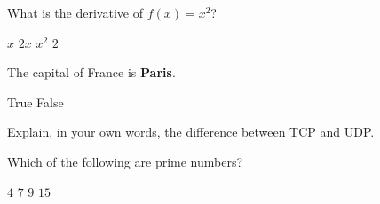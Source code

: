 \documentclass{exam}
\begin{document}
\begin{questions}

\question[2] What is the derivative of $f(x) = x^2$?
\begin{choices}
  \choice $x$
  \CorrectChoice $2x$
  \choice $x^2$
  \choice $2$
\end{choices}

\question[1] The capital of France is \textbf{Paris}.
\begin{choices}
  \CorrectChoice True
  \choice False
\end{choices}

\question Explain, in your own words, the difference between TCP and UDP.

\question[3] Which of the following are prime numbers?
\begin{choices}
  \choice $4$
  \CorrectChoice $7$
  \choice $9$
  \choice $15$
\end{choices}

\end{questions}
\end{document}
